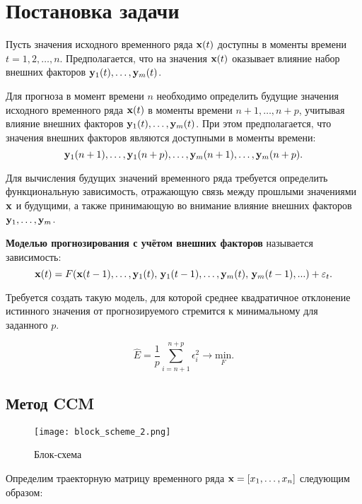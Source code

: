 \documentclass[a4paper, 12pt]{article}
\begin{document}
\section{Постановка задачи}
Пусть значения исходного временного ряда $\mathbf{x}(t)$ доступны в  моменты времени $t = 1, 2, \ldots, n$. Предполагается, что на значения $\mathbf{x}(t)$ оказывает влияние набор внешних факторов $\mathbf{y}_1(t), \ldots, \mathbf{y}_m(t)$.

Для прогноза в момент времени $n$ необходимо определить будущие значения исходного временного ряда $\mathbf{x}(t)$ в моменты времени $n+1, \ldots, n+p$, учитывая влияние внешних факторов $\mathbf{y}_1(t), \ldots, \mathbf{y}_m(t)$. При этом предполагается, что значения внешних факторов являются доступными в моменты времени: \[\mathbf{y}_1(n+1), \ldots, \mathbf{y}_1(n+p), \ldots, \mathbf{y}_m(n+1), \ldots, \mathbf{y}_m(n+p).\]

Для вычисления будущих значений временного ряда требуется определить функциональную зависимость, отражающую связь между прошлыми значениями $\mathbf{x}$ и будущими, а также принимающую во внимание влияние внешних факторов $\mathbf{y}_1, \ldots, \mathbf{y}_m$.

\begin{definition}
	\textbf{Моделью прогнозирования с учётом внешних факторов} называется зависимость:
	\begin{equation*}
		\mathbf{x}(t) = F(\mathbf{x}(t-1), \ldots, \mathbf{y}_1(t), \, \mathbf{y}_1(t-1), \ldots, \mathbf{y}_m(t), \, \mathbf{y}_m(t-1), ...) + \varepsilon_t.
	\end{equation*}
\end{definition}

Требуется создать такую модель, для которой среднее квадратичное отклонение истинного значения от прогнозируемого стремится к минимальному для заданного $p$. 

\begin{equation*}
	\widehat{E} = \dfrac{1}{p} \sum\limits_{i=n+1}^{n+p} \epsilon_i^2 \rightarrow \underset{F}{\text{min}}.
\end{equation*}

\subsection{Метод CCM}
\begin{figure}[bhtp]
	\texttt{[image: block\_scheme\_2.png]}
	\caption{Блок-схема}
	\label{fig:schema}
\end{figure}

Определим траекторную матрицу временного ряда $\mathbf{x} = [x_1, \ldots, x_n]$ следующим образом: 
\end{document}
